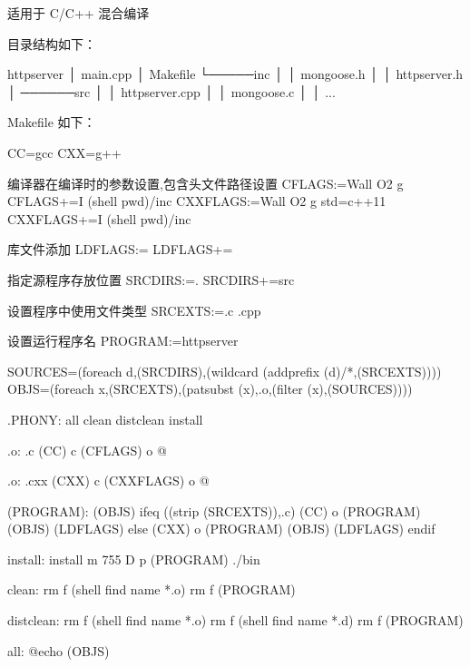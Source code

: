 \documentclass[letterpaper,12pt,english]{sphinxmanual}
\begin{document}
适用于 C/C++ 混合编译

目录结构如下：

\begin{sphinxVerbatim}[commandchars=\\\{\}]
httpserver
│   main.cpp
│   Makefile
└─────inc
│      │   mongoose.h
│      │   http\PYGZus{}server.h
│
──────src
│       │   http\PYGZus{}server.cpp
│       │   mongoose.c
│       │   ...
\end{sphinxVerbatim}

Makefile 如下：

\begin{sphinxVerbatim}[commandchars=\\\{\}]
CC=gcc
CXX=g++

\PYGZsh{} 编译器在编译时的参数设置,包含头文件路径设置
CFLAGS:=\PYGZhy{}Wall \PYGZhy{}O2 \PYGZhy{}g
CFLAGS+=\PYGZhy{}I \PYGZdl{}(shell pwd)/inc
CXXFLAGS:=\PYGZhy{}Wall \PYGZhy{}O2 \PYGZhy{}g \PYGZhy{}std=c++11
CXXFLAGS+=\PYGZhy{}I \PYGZdl{}(shell pwd)/inc

\PYGZsh{} 库文件添加
LDFLAGS:=
LDFLAGS+=

\PYGZsh{} 指定源程序存放位置
SRCDIRS:=.
SRCDIRS+=src

\PYGZsh{} 设置程序中使用文件类型
SRCEXTS:=.c .cpp

\PYGZsh{} 设置运行程序名
PROGRAM:=httpserver

SOURCES=\PYGZdl{}(foreach d,\PYGZdl{}(SRCDIRS),\PYGZdl{}(wildcard \PYGZdl{}(addprefix \PYGZdl{}(d)/*,\PYGZdl{}(SRCEXTS))))
OBJS=\PYGZdl{}(foreach x,\PYGZdl{}(SRCEXTS),\PYGZdl{}(patsubst \PYGZpc{}\PYGZdl{}(x),\PYGZpc{}.o,\PYGZdl{}(filter \PYGZpc{}\PYGZdl{}(x),\PYGZdl{}(SOURCES))))

.PHONY: all clean distclean install

\PYGZpc{}.o: \PYGZpc{}.c
    \PYGZdl{}(CC) \PYGZhy{}c \PYGZdl{}(CFLAGS) \PYGZhy{}o \PYGZdl{}@ \PYGZdl{}\PYGZlt{}

\PYGZpc{}.o: \PYGZpc{}.cxx
    \PYGZdl{}(CXX) \PYGZhy{}c \PYGZdl{}(CXXFLAGS) \PYGZhy{}o \PYGZdl{}@ \PYGZdl{}\PYGZlt{}


\PYGZdl{}(PROGRAM): \PYGZdl{}(OBJS)
ifeq (\PYGZdl{}(strip \PYGZdl{}(SRCEXTS)),.c)
    \PYGZdl{}(CC) \PYGZhy{}o \PYGZdl{}(PROGRAM) \PYGZdl{}(OBJS) \PYGZdl{}(LDFLAGS)
else
    \PYGZdl{}(CXX) \PYGZhy{}o \PYGZdl{}(PROGRAM) \PYGZdl{}(OBJS) \PYGZdl{}(LDFLAGS)
endif


install:
    install \PYGZhy{}m 755 \PYGZhy{}D \PYGZhy{}p \PYGZdl{}(PROGRAM) ./bin

clean:
    rm \PYGZhy{}f \PYGZdl{}(shell find \PYGZhy{}name \PYGZdq{}*.o\PYGZdq{})
    rm \PYGZhy{}f \PYGZdl{}(PROGRAM)

distclean:
    rm \PYGZhy{}f \PYGZdl{}(shell find \PYGZhy{}name \PYGZdq{}*.o\PYGZdq{})
    rm \PYGZhy{}f \PYGZdl{}(shell find \PYGZhy{}name \PYGZdq{}*.d\PYGZdq{})
    rm \PYGZhy{}f \PYGZdl{}(PROGRAM)

all:
    @echo \PYGZdl{}(OBJS)
\end{sphinxVerbatim}
\end{document}
